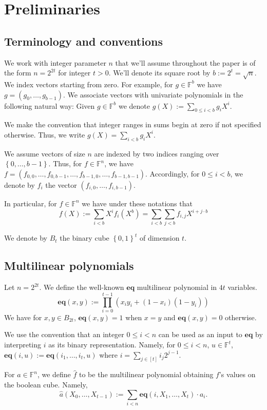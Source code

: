 \documentclass[11pt]{article} %
\newcommand{\F}{\ensuremath{\mathbb F}\xspace}
\newcommand{\defeq}{:=}
\newcommand{\set}[1]{\ensuremath{\left\{#1\right\}}\xspace}
\newcommand{\sumi}[1]{\sum_{i< #1}}
\newcommand{\sumj}[1]{\sum_{j< #1}}
\newcommand{\eq}{\ensuremath{\mathsf{eq}}\xspace}
\renewcommand{\eq}{\ensuremath{\mathbf{eq}}\xspace}
\newcommand{\mle}[1]{\ensuremath{\hat{#1}}\xspace}
\newcommand{\prodt}{\ensuremath{\prod_{i=0}^{t-1}}\xspace}
\newcommand{\B}[1]{\ensuremath{B_{#1}}\xspace}
\begin{document}
\section{Preliminaries}
\subsection{Terminology and conventions}\label{sec:terminology}
We work with integer parameter $n$ that we'll assume throughout the paper  is of the form
$n=2^{2t}$ for integer $t>0$. We'll denote its square root by $b\defeq 2^t=\sqrt{n}$.
We index vectors starting from zero. For example, for $g\in \F^b$ we have $g=(g_0,\ldots,g_{b-1})$.
We associate vectors with univariate polynomials in the following natural way:
Given $g\in \F^b$ we denote $g(X)\defeq \sum_{0\leq i < b} g_i X^i$.

We make the convention that integer ranges in sums begin at zero if not specified otherwise. Thus, we write
$g(X)=\sumi{b}g_i X^i$.

We assume vectors of size $n$ are indexed by two indices ranging over $\set{0,\ldots,b-1}$. Thus, for $f\in \F^n$, we have $f=(f_{0,0},\ldots,f_{0,b-1},\ldots,f_{b-1,0},\ldots,f_{b-1,b-1})$.
Accordingly, for $0\leq i <b$, we denote by $f_i$ the vector $(f_{i,0},\ldots, f_{i,b-1})$.

In particular, for $f\in \F^n$ we have under these notations that
\[f(X)\defeq \sumi{b}X^i f_i(X^b) = \sumi{b}\sumj{b}f_{i,j}X^{i+j\cdot b}\]
 
We denote by \B{t} the binary cube $\set{0,1}^t$ of dimension $t$.
\subsection{Multilinear polynomials}\label{sec:multilin-polys}
Let $n=2^{2t}$.
We define the well-known \eq multilinear polynomial in $4t$ variables. 
\[\eq(x,y) \defeq \prodt ( x_i y_i + (1-x_i)(1-y_i))\]
We have for $x,y \in \B{2t}$, $\eq(x,y)=1$ when $x=y$ and $\eq(x,y)=0$ otherwise.

We use the convention that an integer $0\leq i < n$ can be used as an input to \eq by interpreting $i$ as its binary representation.
Namely, for $0\leq i <n$, $u\in \F^t$, $\eq(i,u)\defeq \eq(i_1,\ldots, i_t,u)$ where $i=\sum_{j\in [t]} i_j 2^{j-1}$.

For $a\in \F^n$, we define $\mle{f}$ to be the multilinear polynomial obtaining $f$'s values on the boolean cube.
Namely,
\[\mle{a}(X_0,\ldots,X_{t-1}) \defeq \sumi{n}\eq(i,X_1,\ldots,X_t)\cdot a_i.\]
\end{document}
